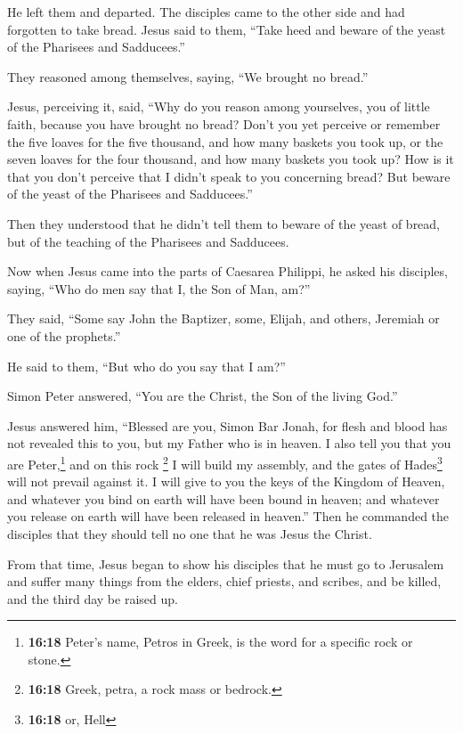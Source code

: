 He left them and departed.  The disciples came to the
other side and had forgotten to take bread.  Jesus said to
them, ``Take heed and beware of the yeast of the Pharisees and
Sadducees.''

 They reasoned among themselves, saying, ``We brought no
bread.''

 Jesus, perceiving it, said, ``Why do you reason among
yourselves, you of little faith, because you have brought no bread?
 Don't you yet perceive or remember the five loaves for
the five thousand, and how many baskets you took up,  or
the seven loaves for the four thousand, and how many baskets you took
up?  How is it that you don't perceive that I didn't
speak to you concerning bread? But beware of the yeast of the Pharisees
and Sadducees.''

 Then they understood that he didn't tell them to beware
of the yeast of bread, but of the teaching of the Pharisees and
Sadducees.

 Now when Jesus came into the parts of Caesarea Philippi,
he asked his disciples, saying, ``Who do men say that I, the Son of Man,
am?''

 They said, ``Some say John the Baptizer, some, Elijah,
and others, Jeremiah or one of the prophets.''

 He said to them, ``But who do you say that I am?''

 Simon Peter answered, ``You are the Christ, the Son of
the living God.''

 Jesus answered him, ``Blessed are you, Simon Bar Jonah,
for flesh and blood has not revealed this to you, but my Father who is
in heaven.  I also tell you that you are
Peter,\footnote{\textbf{16:18} Peter's name, Petros in Greek, is the
  word for a specific rock or stone.} and on this rock \footnote{\textbf{16:18}
  Greek, petra, a rock mass or bedrock.} I will build my assembly, and
the gates of Hades\footnote{\textbf{16:18} or, Hell} will not prevail
against it.  I will give to you the keys of the Kingdom
of Heaven, and whatever you bind on earth will have been bound in
heaven; and whatever you release on earth will have been released in
heaven.''  Then he commanded the disciples that they
should tell no one that he was Jesus the Christ.

 From that time, Jesus began to show his disciples that
he must go to Jerusalem and suffer many things from the elders, chief
priests, and scribes, and be killed, and the third day be raised up.

